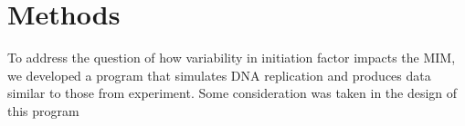 \chapter{Methods}

To address the question of how variability in initiation factor impacts the MIM, we developed a program that simulates DNA replication and produces data similar to those from experiment.
Some consideration was taken in the design of this program 